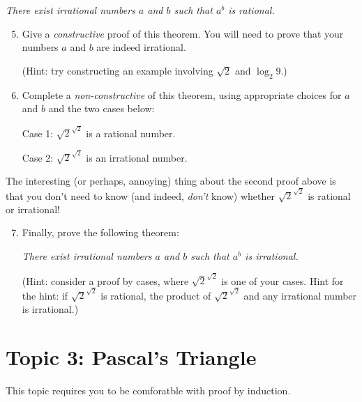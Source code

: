 \documentclass[letterpaper,12pt]{article}
\theoremstyle{definition}
\begin{document}
 {\em There exist irrational numbers $a$ and $b$ such that $a^b$ is rational.}
\begin{enumerate}\setcounter{enumi}{4}
 \item Give a {\em constructive} proof of this theorem. You will need to prove that your numbers $a$ and $b$ are indeed irrational.

(Hint: try constructing an example involving $\sqrt{2}$ and $\log_2 9$.)

 \item Complete a {\em non-constructive} of this theorem, using appropriate choices for $a$ and $b$ and the two cases below:

Case 1: $\sqrt{2}^{\sqrt{2}}$ is a rational number.

Case 2: $\sqrt{2}^{\sqrt{2}}$ is an irrational number.
\end{enumerate}
The interesting (or perhaps, annoying) thing about the second proof above is that you don't need to know (and indeed, {\em don't} know) whether $\sqrt{2}^{\sqrt{2}}$ is rational or irrational!
\begin{enumerate}\setcounter{enumi}{6}
 \item Finally, prove the following theorem:

 {\em There exist irrational numbers $a$ and $b$ such that $a^b$ is irrational.}

(Hint: consider a proof by cases, where $\sqrt{2}^{\sqrt{2}}$ is one of your cases. Hint for the hint: if $\sqrt{2}^{\sqrt{2}}$ is rational, the product of $\sqrt{2}^{\sqrt{2}}$ and any irrational number is irrational.)
\end{enumerate}

\section*{Topic 3: Pascal's Triangle}
This topic requires you to be comforatble with proof by induction.
\end{document}
